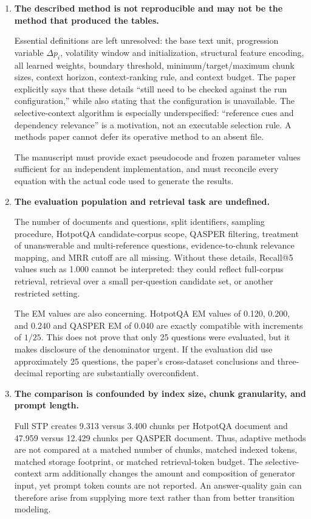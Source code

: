 \documentclass[11pt]{article}
\begin{document}
\begin{enumerate}
  \item \textbf{The described method is not reproducible and may not be the method that produced the tables.}

  Essential definitions are left unresolved: the base text unit, progression variable $\Delta p_i$, volatility window and initialization, structural feature encoding, all learned weights, boundary threshold, minimum/target/maximum chunk sizes, context horizon, context-ranking rule, and context budget. The paper explicitly says that these details ``still need to be checked against the run configuration,'' while also stating that the configuration is unavailable. The selective-context algorithm is especially underspecified: ``reference cues and dependency relevance'' is a motivation, not an executable selection rule. A methods paper cannot defer its operative method to an absent file.

  The manuscript must provide exact pseudocode and frozen parameter values sufficient for an independent implementation, and must reconcile every equation with the actual code used to generate the results.

  \item \textbf{The evaluation population and retrieval task are undefined.}

  The number of documents and questions, split identifiers, sampling procedure, HotpotQA candidate-corpus scope, QASPER filtering, treatment of unanswerable and multi-reference questions, evidence-to-chunk relevance mapping, and MRR cutoff are all missing. Without these details, Recall@5 values such as 1.000 cannot be interpreted: they could reflect full-corpus retrieval, retrieval over a small per-question candidate set, or another restricted setting.

  The EM values are also concerning. HotpotQA EM values of 0.120, 0.200, and 0.240 and QASPER EM of 0.040 are exactly compatible with increments of $1/25$. This does not prove that only 25 questions were evaluated, but it makes disclosure of the denominator urgent. If the evaluation did use approximately 25 questions, the paper's cross-dataset conclusions and three-decimal reporting are substantially overconfident.

  \item \textbf{The comparison is confounded by index size, chunk granularity, and prompt length.}

  Full STP creates 9.313 versus 3.400 chunks per HotpotQA document and 47.959 versus 12.429 chunks per QASPER document. Thus, adaptive methods are not compared at a matched number of chunks, matched indexed tokens, matched storage footprint, or matched retrieval-token budget. The selective-context arm additionally changes the amount and composition of generator input, yet prompt token counts are not reported. An answer-quality gain can therefore arise from supplying more text rather than from better transition modeling.


\end{enumerate}
\end{document}
